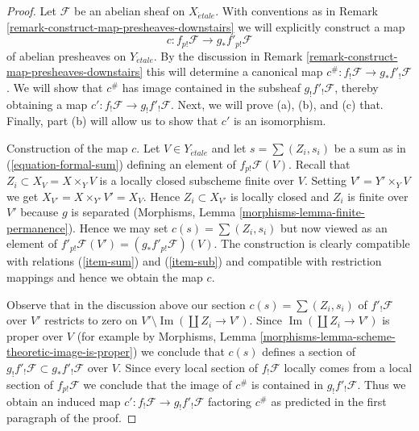 \documentclass{stacks-project}
\theoremstyle{plain}
\theoremstyle{definition}
\theoremstyle{remark}
\numberwithin{equation}{subsection}
\def\etale{{\acute{e}tale}}
\def\Im{\mathop{\mathrm{Im}}}
\begin{document}
\begin{proof}
Let $\mathcal{F}$ be an abelian sheaf on $X_\etale$. With conventions as in
Remark \ref{remark-construct-map-presheaves-downstairs} we will explicitly
construct a map
$$
c : f_{p!}\mathcal{F} \longrightarrow g_*f'_{p!}\mathcal{F}
$$
of abelian presheaves on $Y_\etale$. By the discussion in
Remark \ref{remark-construct-map-presheaves-downstairs}
this will determine a canonical map
$c^\# : f_!\mathcal{F} \to g_*f'_!\mathcal{F}$.
We will show that $c^\#$ has image contained in the subsheaf
$g_!f'_!\mathcal{F}$, thereby obtaining a map
$c' : f_!\mathcal{F} \to g_!f'_!\mathcal{F}$. Next, we will prove
(a), (b), and (c) that. Finally, part (b)
will allow us to show that $c'$ is an isomorphism.

\medskip\noindent
Construction of the map $c$. Let $V \in Y_\etale$ and
let $s = \sum (Z_i, s_i)$ be a sum as in (\ref{equation-formal-sum})
defining an element of $f_{p!}\mathcal{F}(V)$.
Recall that $Z_i \subset X_V = X \times_Y V$
is a locally closed subscheme finite over $V$.
Setting $V' = Y' \times_Y V$ we get $X_{V'} = X \times_{Y'} V' = X_V$.
Hence $Z_i \subset X_{V'}$ is locally closed and
$Z_i$ is finite over $V'$ because $g$ is separated
(Morphisms, Lemma \ref{morphisms-lemma-finite-permanence}).
Hence we may set $c(s) = \sum (Z_i, s_i)$ but now viewed
as an element of $f'_{p!}\mathcal{F}(V') = (g_*f'_{p!}\mathcal{F})(V)$.
The construction is clearly compatible with relations
(\ref{item-sum}) and (\ref{item-sub})
and compatible with restriction mappings and hence we obtain the map $c$.

\medskip\noindent
Observe that in the discussion above our section $c(s) = \sum (Z_i, s_i)$ of
$f'_!\mathcal{F}$ over $V'$ restricts to zero on
$V' \setminus \Im(\coprod Z_i \to V')$. Since $\Im(\coprod Z_i \to V')$
is proper over $V$ (for example by Morphisms, Lemma
\ref{morphisms-lemma-scheme-theoretic-image-is-proper})
we conclude that $c(s)$ defines a section of
$g_!f'_!\mathcal{F} \subset g_*f'_!\mathcal{F}$ over $V$.
Since every local section of $f_!\mathcal{F}$ locally comes from a
local section of $f_{p!}\mathcal{F}$ we conclude that the image
of $c^\#$ is contained in $g_!f'_!\mathcal{F}$.
Thus we obtain an induced map $c' : f_!\mathcal{F} \to g_!f'_!\mathcal{F}$
factoring $c^\#$ as predicted in the first paragraph of the proof.


\end{proof}
\end{document}
